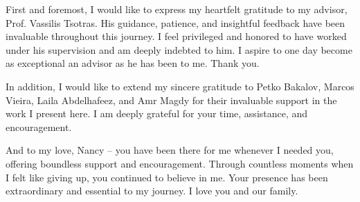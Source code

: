 \begin{acknowledgements}

First and foremost, I would like to express my heartfelt gratitude to my advisor, Prof. Vassilis Tsotras. His guidance, patience, and insightful feedback have been invaluable throughout this journey. I feel privileged and honored to have worked under his supervision and am deeply indebted to him. I aspire to one day become as exceptional an advisor as he has been to me. Thank you.

In addition, I would like to extend my sincere gratitude to Petko Bakalov, Marcos Vieira, Laila Abdelhafeez, and Amr Magdy for their invaluable support in the work I present here. I am deeply grateful for your time, assistance, and encouragement.

And to my love, Nancy – you have been there for me whenever I needed you, offering boundless support and encouragement. Through countless moments when I felt like giving up, you continued to believe in me. Your presence has been extraordinary and essential to my journey. I love you and our family.

\end{acknowledgements}
